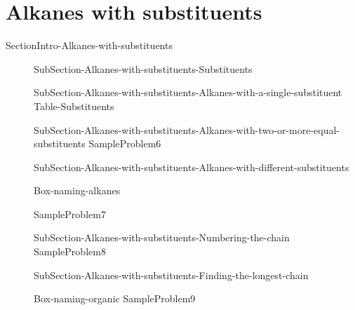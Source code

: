 \documentclass[main.tex]{subfiles}
\newcommand\chapterlabel{Ch-orgo}\setcounter{figurenewcounter}{0}\setcounter{tablenewcounter}{0}\setcounter{formulanewcounter}{0}
\begin{document}
 
\section{Alkanes with substituents}{SectionIntro-Alkanes-with-substituents}
\sloppy\begin{description}
\item[]{SubSection-Alkanes-with-substituents-Substituents}
\item[]{SubSection-Alkanes-with-substituents-Alkanes-with-a-single-substituent}
\hspace{-3cm}
{Table-Substituents}
\item[]{SubSection-Alkanes-with-substituents-Alkanes-with-two-or-more-equal-substituents}
{SampleProblem6}
\item[]{SubSection-Alkanes-with-substituents-Alkanes-with-different-substituents}
\item[]{Box-naming-alkanes}

{SampleProblem7}
\item[]{SubSection-Alkanes-with-substituents-Numbering-the-chain}
{SampleProblem8}
\item[]{SubSection-Alkanes-with-substituents-Finding-the-longest-chain}
\item[]{Box-naming-organic} 
{SampleProblem9}
\end{description}
\end{document}
